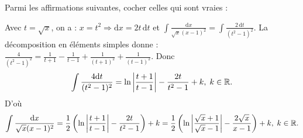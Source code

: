\begin{question}
Parmi les affirmations suivantes, cocher celles qui sont vraies :
\begin{answers}
\bad{Une primitive de $\displaystyle \frac{1}{\sqrt{x}(x-1)^2}$ sur $]1,+\infty[$ est $\displaystyle \ln \left|\frac{\sqrt{x}+1}{\sqrt{x}-1}\right|-\frac{2\sqrt{x}}{x-1}$.}
\end{answers}
\vskip2mm
\begin{explanations}
Avec $\displaystyle t=\sqrt{x}$, on a : $\displaystyle x=t^2\Rightarrow \mathrm{d}x=2t\, \mathrm{d}t$ et $\displaystyle \int \frac{\mathrm{d}x}{\sqrt{x}(x-1)^2}=\int \frac{2\, \mathrm{d}t}{(t^2-1)^2}$. La décomposition en éléments simples donne : $\displaystyle \frac{4}{(t^2-1)^2}=\frac{1}{t+1}-\frac{1}{t-1}+\frac{1}{(t+1)^2}+\frac{1}{(t-1)^2}$. Donc
$$\int \frac{4\mathrm{d}t}{(t^2-1)^2}=\ln \left|\frac{t+1}{t-1}\right|-\frac{2t}{t^2-1}+k,\; k\in \mathbb{R}.$$
D'où
$$\int \frac{\mathrm{d}x}{\sqrt{x}(x-1)^2}=\frac{1}{2}\left(\ln \left|\frac{t+1}{t-1}\right|-\frac{2t}{t^2-1}\right)+k=\frac{1}{2}\left(\ln \left|\frac{\sqrt{x}+1}{\sqrt{x}-1}\right|-\frac{2\sqrt{x}}{x-1}\right)+k,\; k\in \mathbb{R}.$$
\end{explanations}
\end{question}

